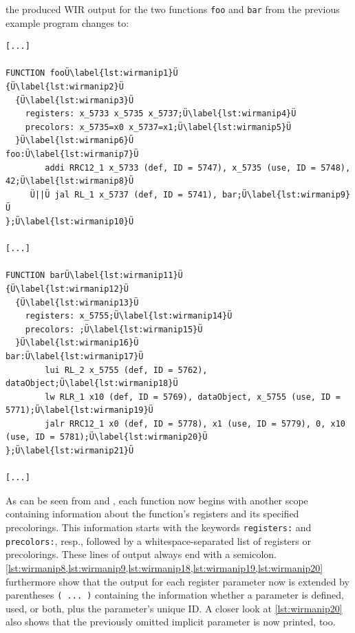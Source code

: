 the produced \gls{WIR} output for the two functions \texttt{foo} and \texttt{bar} from the previous example program changes to:

\begin{lstlisting}[style=commandline,float=!h]
[...]

FUNCTION fooÜ\label{lst:wirmanip1}Ü
{Ü\label{lst:wirmanip2}Ü
  {Ü\label{lst:wirmanip3}Ü
    registers: x_5733 x_5735 x_5737;Ü\label{lst:wirmanip4}Ü
    precolors: x_5735=x0 x_5737=x1;Ü\label{lst:wirmanip5}Ü
  }Ü\label{lst:wirmanip6}Ü
foo:Ü\label{lst:wirmanip7}Ü
        addi RRC12_1 x_5733 (def, ID = 5747), x_5735 (use, ID = 5748), 42;Ü\label{lst:wirmanip8}Ü
     Ü||Ü jal RL_1 x_5737 (def, ID = 5741), bar;Ü\label{lst:wirmanip9}Ü
};Ü\label{lst:wirmanip10}Ü

[...]

FUNCTION barÜ\label{lst:wirmanip11}Ü
{Ü\label{lst:wirmanip12}Ü
  {Ü\label{lst:wirmanip13}Ü
    registers: x_5755;Ü\label{lst:wirmanip14}Ü
    precolors: ;Ü\label{lst:wirmanip15}Ü
  }Ü\label{lst:wirmanip16}Ü
bar:Ü\label{lst:wirmanip17}Ü
        lui RL_2 x_5755 (def, ID = 5762), dataObject;Ü\label{lst:wirmanip18}Ü
        lw RLR_1 x10 (def, ID = 5769), dataObject, x_5755 (use, ID = 5771);Ü\label{lst:wirmanip19}Ü
        jalr RRC12_1 x0 (def, ID = 5778), x1 (use, ID = 5779), 0, x10 (use, ID = 5781);Ü\label{lst:wirmanip20}Ü
};Ü\label{lst:wirmanip21}Ü

[...]
\end{lstlisting}

As can be seen from  and , each function now begins with another scope containing information about the function's registers and its specified precolorings.
This information starts with the keywords \texttt{registers:} and \texttt{precolors:}, resp., followed by a whitespace-separated list of registers or precolorings.
These lines of output always end with a semicolon.
\cref{lst:wirmanip8,lst:wirmanip9,lst:wirmanip18,lst:wirmanip19,lst:wirmanip20} furthermore show that the output for each register parameter now is extended by parentheses \texttt{(\,...\,)} containing the information whether a parameter is defined, used, or both, plus the parameter's unique ID.
A closer look at \cref{lst:wirmanip20} also shows that the previously omitted implicit parameter is now printed, too.

